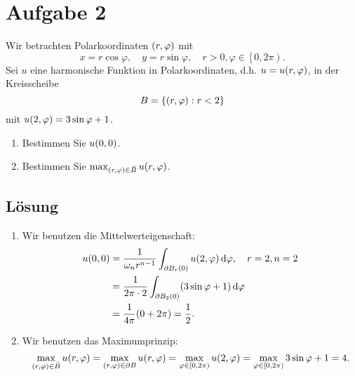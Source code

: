 \documentclass{exercise}
\begin{document}
    \section*{Aufgabe 2}
    
    \begin{problem}
        Wir betrachten Polarkoordinaten \(\parentheses*{r, \varphi}\) mit
        \[
            x = r\cos\varphi, \quad y = r\sin\varphi, \quad r > 0, \varphi \in \left[0, 2\pi\right).
        \]
        Sei \(u\) eine harmonische Funktion in Polarkoordinaten, d.h. \(u = u\parentheses*{r, \varphi}\), in der Kreisscheibe
        \[
            B = \braces*{\parentheses*{r, \varphi} : r < 2}
        \]
        mit \(u\parentheses*{2, \varphi} = 3\sin\varphi + 1\).
        \begin{enumerate}
            \item Bestimmen Sie \(u\parentheses*{0, 0}\).
            \item Bestimmen Sie \(\max_{\parentheses*{r, \varphi} \in \bar{B}}u\parentheses*{r, \varphi}\). 
        \end{enumerate}
    \end{problem}
    
    \subsection*{Lösung}
    \begin{enumerate}
        \item Wir benutzen die Mittelwerteigenschaft:
        \begin{align*}
            u\parentheses*{0, 0} &= \frac{1}{\omega_n r^{n - 1}}\int_{\partial B_r\parentheses*{0}}u\parentheses*{2, \varphi}\d\varphi, \quad r = 2, n = 2\\
            &= \frac{1}{2\pi \cdot 2}\int_{\partial B_2\parentheses*{0}}\parentheses*{3\sin\varphi + 1}\d\varphi\\
            &= \frac{1}{4\pi}\parentheses*{0 + 2\pi} = \frac{1}{2}.
        \end{align*}
        \item Wir benutzen das Maximumprinzip:
        \[
            \max_{\parentheses*{r, \varphi} \in \bar{B}}u\parentheses*{r, \varphi} = \max_{\parentheses*{r, \varphi} \in \partial B}u\parentheses*{r, \varphi} = \max_{\varphi \in \left[0, 2\pi\right)}u\parentheses*{2, \varphi} = \max_{\varphi \in \left[0, 2\pi\right)}3\sin\varphi + 1 = 4.
        \]
    \end{enumerate}
\end{document}
